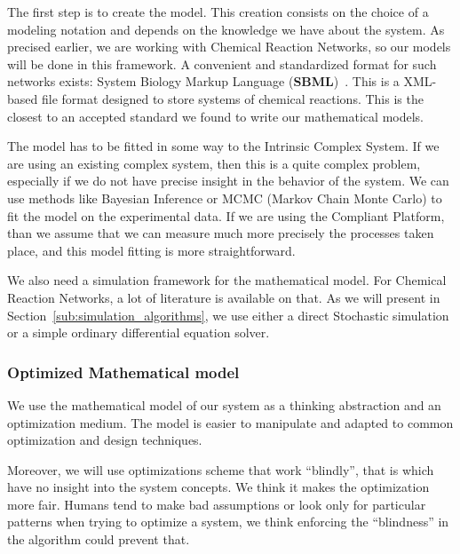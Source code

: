 \begin{my_itemize}
	\item The first step is to create the model. This creation consists on the choice of a modeling notation and depends on the knowledge we have about the system. As precised earlier, we are working with Chemical Reaction Networks, so our models will be done in this framework.
	A convenient and standardized format for such networks exists: System Biology Markup Language (\textbf{SBML})~\cite{Hucka:2003p7447}. This is a XML-based file format designed to store systems of chemical reactions. This is the closest to an accepted standard we found to write our mathematical models.
	\item The model has to be fitted in some way to the Intrinsic Complex System. If we are using an existing complex system, then this is a quite complex problem, especially if we do not have precise insight in the behavior of the system. We can use methods like Bayesian Inference or MCMC (Markov Chain Monte Carlo) to fit the model on the experimental data. If we are using the Compliant Platform, than we assume that we can measure much more precisely the processes taken place, and this model fitting is more straightforward.
	\item We also need a simulation framework for the mathematical model. For Chemical Reaction Networks, a lot of literature is available on that. As we will present in Section~\ref{sub:simulation_algorithms}, we use either a direct Stochastic simulation or a simple ordinary differential equation solver.
\end{my_itemize}


\subsubsection{Optimized Mathematical model} %
\label{ssub:optimized_mathematical_model}

We use the mathematical model of our system as a thinking abstraction and an optimization medium. The model is easier to manipulate and adapted to common optimization and design techniques.

Moreover, we will use optimizations scheme that work ``blindly'', that is which have no insight into the system concepts. We think it makes the optimization more fair. Humans tend to make bad assumptions or look only for particular patterns when trying to optimize a system, we think enforcing the ``blindness'' in the algorithm could prevent that. 

